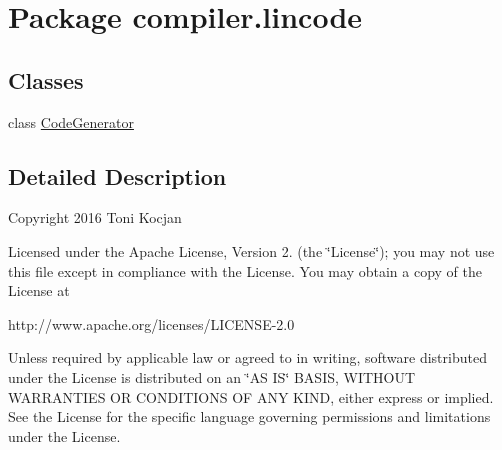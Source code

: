 \hypertarget{namespacecompiler_1_1lincode}{}\section{Package compiler.\+lincode}
\label{namespacecompiler_1_1lincode}
\subsection*{Classes}
\begin{DoxyCompactItemize}
\item 
class \hyperlink{classcompiler_1_1lincode_1_1_code_generator}{Code\+Generator}
\end{DoxyCompactItemize}


\subsection{Detailed Description}
Copyright 2016 Toni Kocjan

Licensed under the Apache License, Version 2. (the \char`\"{}\+License\char`\"{}); you may not use this file except in compliance with the License. You may obtain a copy of the License at \begin{DoxyVerb}http://www.apache.org/licenses/LICENSE-2.0
\end{DoxyVerb}


Unless required by applicable law or agreed to in writing, software distributed under the License is distributed on an \char`\"{}\+A\+S I\+S\char`\"{} B\+A\+S\+IS, W\+I\+T\+H\+O\+UT W\+A\+R\+R\+A\+N\+T\+I\+ES OR C\+O\+N\+D\+I\+T\+I\+O\+NS OF A\+NY K\+I\+ND, either express or implied. See the License for the specific language governing permissions and limitations under the License. 